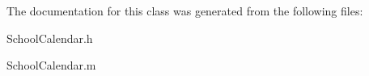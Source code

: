 \-The documentation for this class was generated from the following files\-:\begin{DoxyCompactItemize}
\item 
\-School\-Calendar.\-h\item 
\-School\-Calendar.\-m\end{DoxyCompactItemize}
